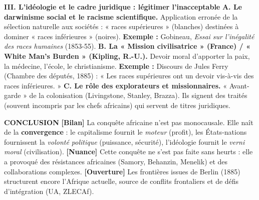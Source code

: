 \documentclass[11pt]{article}
\newcommand{\cle}[1]{{\popxbold\color{popdark}#1}}
\begin{document}
\begin{exoresolu}
\textbf{III. L'idéologie et le cadre juridique : légitimer l'inacceptable}
\textbf{A. Le darwinisme social et le racisme scientifique.} Application erronée de la sélection naturelle aux sociétés : « races supérieures » (blanches) destinées à dominer « races inférieures » (noires). \textbf{Exemple :} Gobineau, \emph{Essai sur l'inégalité des races humaines} (1853-55).
\textbf{B. La « Mission civilisatrice » (France) / « White Man's Burden » (Kipling, R.-U.).} Devoir moral d'apporter la paix, la médecine, l'école, le christianisme. \textbf{Exemple :} Discours de \cle{Jules Ferry} (Chambre des députés, 1885) : « Les races supérieures ont un devoir vis-à-vis des races inférieures. »
\textbf{C. Le rôle des explorateurs et missionnaires.} « Avant-garde » de la colonisation (Livingstone, Stanley, Brazza). Ils signent des traités (souvent incompris par les chefs africains) qui servent de titres juridiques.

\textbf{CONCLUSION}
\textbf{[Bilan]} La conquête africaine n'est pas monocausale. Elle naît de la \textbf{convergence} : le capitalisme fournit le \emph{moteur} (profit), les États-nations fournissent la \emph{volonté politique} (puissance, sécurité), l'idéologie fournit le \emph{verni moral} (civilisation).
\textbf{[Nuance]} Cette conquête ne s'est pas faite sans heurts : elle a provoqué des \cle{résistances africaines} (Samory, Behanzin, Menelik) et des \cle{collaborations} complexes.
\textbf{[Ouverture]} Les frontières issues de Berlin (1885) structurent encore l'Afrique actuelle, source de conflits frontaliers et de défis d'intégration (UA, ZLECAf).
\end{exoresolu}
\end{document}
